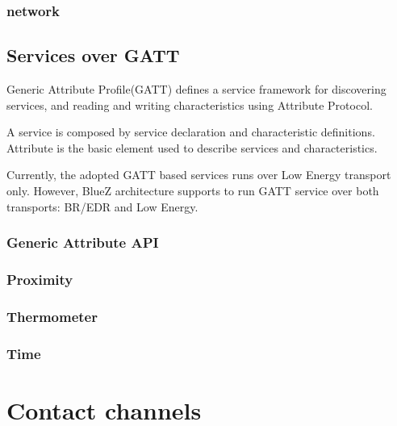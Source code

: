 \documentclass[11pt]{article}
\begin{document}
\subsubsection{network}

\subsection{Services over GATT}

Generic Attribute Profile(GATT) defines a service framework for discovering
services, and reading and writing characteristics using Attribute Protocol.

A service is composed by service declaration and characteristic definitions.
Attribute is the basic element used to describe services and characteristics.

Currently, the adopted GATT based services runs over Low Energy transport only.
However, BlueZ architecture supports to run GATT service over both transports:
BR/EDR and Low Energy.

\subsubsection{Generic Attribute API}
\subsubsection{Proximity}
\subsubsection{Thermometer}
\subsubsection{Time}

\section{Contact channels}
\end{document}
